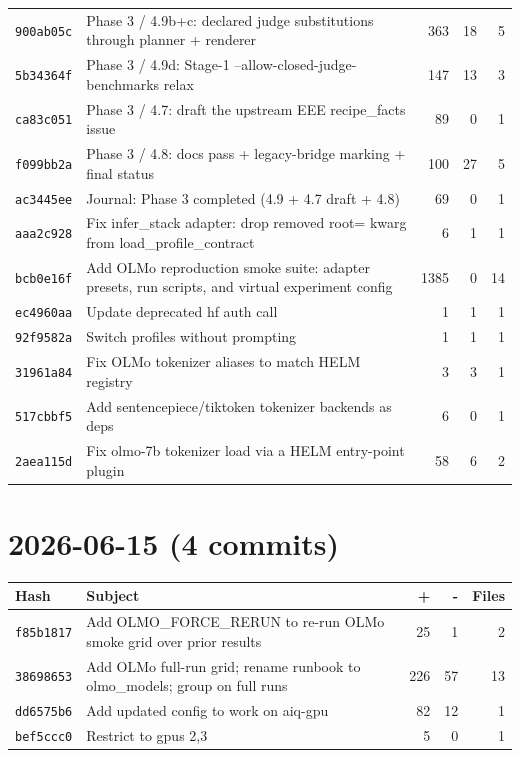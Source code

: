 \begin{longtable}{@{}p{}p{}r r r@{}}
\texttt{900ab05c} & Phase 3 / 4.9b+c: declared judge substitutions through planner + renderer & 363 & 18 & 5 \\
\texttt{5b34364f} & Phase 3 / 4.9d: Stage-1 --allow-closed-judge-benchmarks relax & 147 & 13 & 3 \\
\texttt{ca83c051} & Phase 3 / 4.7: draft the upstream EEE recipe\_facts issue & 89 & 0 & 1 \\
\texttt{f099bb2a} & Phase 3 / 4.8: docs pass + legacy-bridge marking + final status & 100 & 27 & 5 \\
\texttt{ac3445ee} & Journal: Phase 3 completed (4.9 + 4.7 draft + 4.8) & 69 & 0 & 1 \\
\texttt{aaa2c928} & Fix infer\_stack adapter: drop removed root= kwarg from load\_profile\_contract & 6 & 1 & 1 \\
\texttt{bcb0e16f} & Add OLMo reproduction smoke suite: adapter presets, run scripts, and virtual experiment config & 1385 & 0 & 14 \\
\texttt{ec4960aa} & Update deprecated hf auth call & 1 & 1 & 1 \\
\texttt{92f9582a} & Switch profiles without prompting & 1 & 1 & 1 \\
\texttt{31961a84} & Fix OLMo tokenizer aliases to match HELM registry & 3 & 3 & 1 \\
\texttt{517cbbf5} & Add sentencepiece/tiktoken tokenizer backends as deps & 6 & 0 & 1 \\
\texttt{2aea115d} & Fix olmo-7b tokenizer load via a HELM entry-point plugin & 58 & 6 & 2 \\
\bottomrule\end{longtable}
\section*{2026-06-15 (4 commits)}
\begin{longtable}{@{}p{}p{}r r r@{}}
\toprule Hash & Subject & + & - & Files \\ \midrule\endhead
\texttt{f85b1817} & Add OLMO\_FORCE\_RERUN to re-run OLMo smoke grid over prior results & 25 & 1 & 2 \\
\texttt{38698653} & Add OLMo full-run grid; rename runbook to olmo\_models; group on full runs & 226 & 57 & 13 \\
\texttt{dd6575b6} & Add updated config to work on aiq-gpu & 82 & 12 & 1 \\
\texttt{bef5ccc0} & Restrict to gpus 2,3 & 5 & 0 & 1 \\
\bottomrule\end{longtable}
